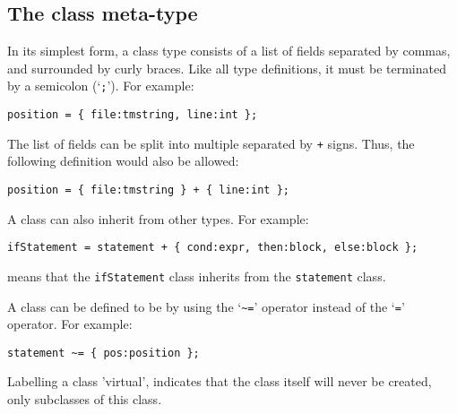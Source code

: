 \subsection{The class meta-type}
In its simplest form, a class type consists of a list of fields separated
by commas, and surrounded by curly braces.  Like all type definitions,
it must be terminated by a semicolon (`\verb';'').  For example:
\begin{showfile}
\begin{verbatim}
position = { file:tmstring, line:int };
\end{verbatim}
\end{showfile}
The list of fields can be split into multiple  separated
by \verb'+' signs. Thus, the following definition would also be allowed:
\begin{showfile}
\begin{verbatim}
position = { file:tmstring } + { line:int };
\end{verbatim}
\end{showfile}
A class can also inherit from other types. 
For example:
\begin{showfile}
\begin{verbatim}
ifStatement = statement + { cond:expr, then:block, else:block };
\end{verbatim}
\end{showfile}
means that the \texttt{ifStatement} class inherits from the \texttt{statement}
class.

A class can be defined to be  by using the `\verb'~=''
operator instead of the `\verb'='' operator. For example:
\begin{showfile}
\begin{verbatim}
statement ~= { pos:position };
\end{verbatim}
\end{showfile}
Labelling a class 'virtual', indicates that the class itself will
never be created, only subclasses of this class.

